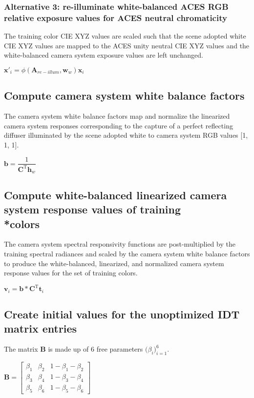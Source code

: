 \subsubsection{Alternative 3: re-illuminate white-balanced ACES RGB relative exposure values for ACES neutral chromaticity}
The training color CIE XYZ values are scaled such that the scene adopted white CIE XYZ values are mapped to the ACES unity neutral CIE XYZ values and the white-balanced camera system exposure values are left unchanged.

$\mathbf{x}'_i = \phi(\mathbf{A}_{re-illum},\mathbf{w}_w)\mathbf{x}_i$

\subsection{Compute camera system white balance factors}
The camera system white balance factors map and normalize the linearized camera system responses corresponding to the capture of a perfect reflecting diffuser illuminated by the scene adopted white to camera system RGB values [1, 1, 1].

$\mathbf{b}=\dfrac{1}{\mathbf{C}^{\mathrm{T}}\mathbf{h}_w}$

\subsection{Compute white-balanced linearized camera system response values of training \\*colors}
The camera system spectral responsivity functions are post-multiplied by the training spectral radiances and scaled by the camera system white balance factors to produce the white-balanced, linearized, and normalized camera system response values for the set of training colors.

$\mathbf{v}_i=\mathbf{b}*\mathbf{C}^{\mathrm{T}}\mathbf{t}_i$

\subsection{Create initial values for the unoptimized IDT matrix entries}
\label{sec:compmat}
The matrix $\mathbf{B}$ is made up of 6 free parameters $\big(\beta_i\big)^{6}_{i=1}$.

$   \mathbf{B} =
    \begin{bmatrix}
		\beta_1 & \beta_2 & 1-\beta_1-\beta_2 \\
		\beta_3 & \beta_4 & 1-\beta_3-\beta_4 \\
		\beta_5 & \beta_6 & 1-\beta_5-\beta_6
    \end{bmatrix}$


